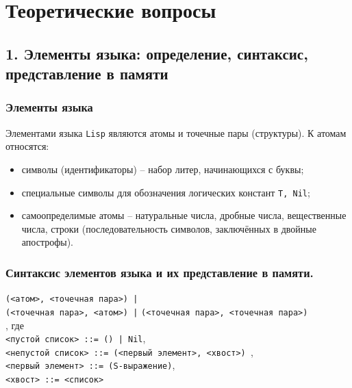 \section*{Теоретические вопросы}

\subsection*{1. Элементы языка: определение, синтаксис, представление в памяти}

\subsubsection{Элементы языка}
Элементами языка {\texttt{Lisp}} являются атомы и точечные пары (структуры). К атомам относятся:
\begin{itemize}[topsep=0pt, noitemsep]
	\item символы (идентификаторы) -- набор литер, начинающихся с буквы;
	\item специальные символы для обозначения логических констант {\texttt{T,~Nil}};
	\item самоопределимые атомы -- натуральные числа, дробные числа, вещественные числа, строки (последовательность символов, заключённых в двойные апострофы).
\end{itemize}

\subsubsection*{Синтаксис элементов языка и их представление в памяти.}

{\texttt{(<атом>, <точечная пара>) |}}\\
{\texttt{(<точечная пара>, <атом>) |}}
{\texttt{(<точечная пара>, <точечная пара>)}}\\

, где\\
{\texttt{<пустой список> ::= () | Nil}},\\
{\texttt{<непустой список> ::= (<первый элемент>, <хвост>) }},\\
{\texttt{<первый элемент> ::= (S-выражение)}},\\
{\texttt{<хвост> ::= <список>}}\\


